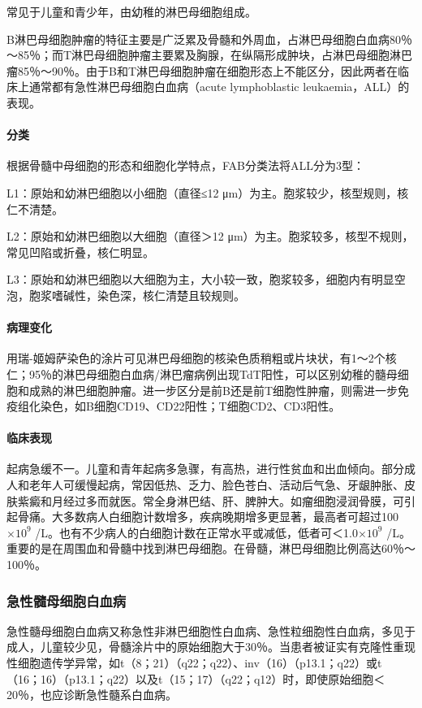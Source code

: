常见于儿童和青少年，由幼稚的淋巴母细胞组成。

B淋巴母细胞肿瘤的特征主要是广泛累及骨髓和外周血，占淋巴母细胞白血病80％～85％；而T淋巴母细胞肿瘤主要累及胸腺，在纵隔形成肿块，占淋巴母细胞淋巴瘤85％～90％。由于B和T淋巴母细胞肿瘤在细胞形态上不能区分，因此两者在临床上通常都有急性淋巴母细胞白血病（acute
lymphoblastic leukaemia，ALL）的表现。

\paragraph{分类}
根据骨髓中母细胞的形态和细胞化学特点，FAB分类法将ALL分为3型：

L1：原始和幼淋巴细胞以小细胞（直径≤12
μm）为主。胞浆较少，核型规则，核仁不清楚。

L2：原始和幼淋巴细胞以大细胞（直径＞12
μm）为主。胞浆较多，核型不规则，常见凹陷或折叠，核仁明显。

L3：原始和幼淋巴细胞以大细胞为主，大小较一致，胞浆较多，细胞内有明显空泡，胞浆嗜碱性，染色深，核仁清楚且较规则。

\paragraph{病理变化}
用瑞-姬姆萨染色的涂片可见淋巴母细胞的核染色质稍粗或片块状，有1～2个核仁；95％的淋巴母细胞白血病/淋巴瘤病例出现TdT阳性，可以区别幼稚的髓母细胞和成熟的淋巴细胞肿瘤。进一步区分是前B还是前T细胞性肿瘤，则需进一步免疫组化染色，如B细胞CD19、CD22阳性；T细胞CD2、CD3阳性。

\paragraph{临床表现}
起病急缓不一。儿童和青年起病多急骤，有高热，进行性贫血和出血倾向。部分成人和老年人可缓慢起病，常因低热、乏力、脸色苍白、活动后气急、牙龈肿胀、皮肤紫癜和月经过多而就医。常全身淋巴结、肝、脾肿大。如瘤细胞浸润骨膜，可引起骨痛。大多数病人白细胞计数增多，疾病晚期增多更显著，最高者可超过100$\times 10^9$
/L。也有不少病人的白细胞计数在正常水平或减低，低者可＜1.0$\times 10^9$
/L。重要的是在周围血和骨髓中找到淋巴母细胞。在骨髓，淋巴母细胞比例高达60％～100％。

\subsubsection{急性髓母细胞白血病}

急性髓母细胞白血病又称急性非淋巴细胞性白血病、急性粒细胞性白血病，多见于成人，儿童较少见，骨髓涂片中的原始细胞大于30％。当患者被证实有克隆性重现性细胞遗传学异常，如t（8；21）（q22；q22）、inv（16）（p13.1；q22）或t（16；16）（p13.1；q22）以及t（15；17）（q22；q12）时，即使原始细胞＜20％，也应诊断急性髓系白血病。

